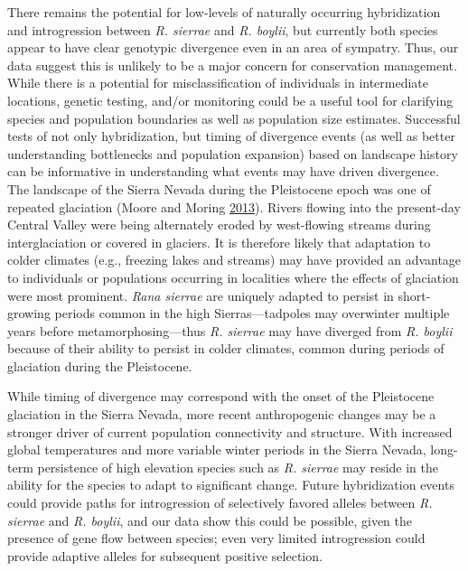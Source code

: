 \documentclass[proquest,12pt,final]{ucthesis-CA2012} %
\begin{document}
\begin{ucmainmatter}
There remains the potential for low-levels of naturally occurring
hybridization and introgression between \emph{R. sierrae} and \emph{R.
boylii}, but currently both species appear to have clear genotypic
divergence even in an area of sympatry. Thus, our data suggest this is
unlikely to be a major concern for conservation management. While there
is a potential for misclassification of individuals in intermediate
locations, genetic testing, and/or monitoring could be a useful tool for
clarifying species and population boundaries as well as population size
estimates. Successful tests of not only hybridization, but timing of
divergence events (as well as better understanding bottlenecks and
population expansion) based on landscape history can be informative in
understanding what events may have driven divergence. The landscape of
the Sierra Nevada during the Pleistocene epoch was one of repeated
glaciation (Moore and Moring
\protect\hyperlink{ref-moore_rangewide_2013}{2013}). Rivers flowing into
the present-day Central Valley were being alternately eroded by
west-flowing streams during interglaciation or covered in glaciers. It
is therefore likely that adaptation to colder climates (e.g., freezing
lakes and streams) may have provided an advantage to individuals or
populations occurring in localities where the effects of glaciation were
most prominent. \emph{Rana sierrae} are uniquely adapted to persist in
short-growing periods common in the high Sierras---tadpoles may
overwinter multiple years before metamorphosing---thus \emph{R. sierrae}
may have diverged from \emph{R. boylii} because of their ability to
persist in colder climates, common during periods of glaciation during
the Pleistocene.

While timing of divergence may correspond with the onset of the
Pleistocene glaciation in the Sierra Nevada, more recent anthropogenic
changes may be a stronger driver of current population connectivity and
structure. With increased global temperatures and more variable winter
periods in the Sierra Nevada, long-term persistence of high elevation
species such as \emph{R. sierrae} may reside in the ability for the
species to adapt to significant change. Future hybridization events
could provide paths for introgression of selectively favored alleles
between \emph{R. sierrae} and \emph{R. boylii}, and our data show this
could be possible, given the presence of gene flow between species; even
very limited introgression could provide adaptive alleles for subsequent
positive selection.


\end{ucmainmatter}
\end{document}
